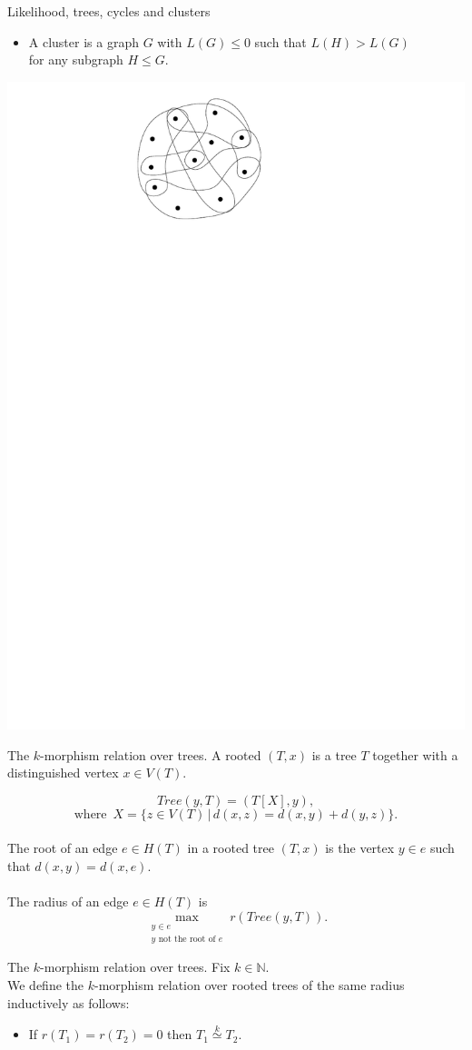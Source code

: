 \documentclass[handout, 11pt]{beamer}
\newcommand{\N}{\mathbb{N}}
\newcommand{\morph}[1]{\stackrel{#1}{\simeq}}
\begin{document}
	\begin{frame}{Likelihood, trees, cycles and clusters}
		\begin{itemize}
			\item A cluster is a graph $G$ with $L(G)\leq 0$ such 
			that $L(H)>L(G)$\\ for any subgraph $H\leq G$.
		\end{itemize}
	\begin{center}
		\includegraphics[width=0.4\linewidth]{Cluster.pdf}
	\end{center}
	\end{frame}
	
	\begin{frame}{The $k$-morphism relation over trees.}
		A rooted $(T,x)$ is a tree $T$ together with a distinguished vertex
		$x\in V(T)$.\par
		\[Tree(y, T) = (T[X], y),\]
		\[\text{where } \, X=\{ z\in V(T) \, | \, d(x,z)=d(x,y)+d(y,z)\}.\]~\\
		The root of an edge $e\in H(T)$ in a rooted tree 
		$(T,x)$ is the vertex $y\in e$ such that $d(x,y)=d(x,e)$.\\~\\
		The radius of an edge $e\in H(T)$ is 
		\[\max_{\substack{y\in e \\ y \text{ not the root of } e}} r(Tree(y,T)). \]
		
	\end{frame}

	\begin{frame}{The $k$-morphism relation over trees.}
		Fix $k\in \N$.\\
		We define the $k$-morphism relation over rooted trees of the same radius
		inductively as follows:
		
		\begin{itemize}
			\item If $r(T_1)=r(T_2)=0$ then $T_1\morph{k} T_2$.
		\end{itemize}
	\end{frame}
\end{document}
